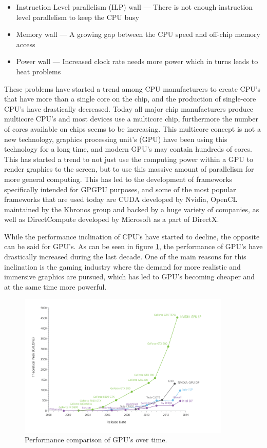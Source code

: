 \begin{itemize}
    \item Instruction Level parallelism (ILP) wall --- There is not enough instruction level parallelism to keep the CPU busy
    \item Memory wall --- A growing gap between the CPU speed and off-chip memory access
    \item Power wall --- Increased clock rate needs more power which in turns leads to heat problems
\end{itemize}

These problems have started a trend among CPU manufacturers to create CPU's that have more than a single core on the chip, and the production of single-core CPU's have drastically decreased. Today all major chip manufacturers produce multicore CPU's and most devices use a multicore chip, furthermore the number of cores available on chips seems to be increasing. This multicore concept is not a new technology, graphics processing unit's (GPU) have been using this technology for a long time, and modern GPU's may contain hundreds of cores. This has started a trend to not just use the computing power within a GPU to render graphics to the screen, but to use this massive amount of parallelism for more general computing. This has led to the development of frameworks specifically intended for GPGPU purposes, and some of the most popular frameworks that are used today are CUDA developed by Nvidia, OpenCL maintained by the Khronos group and backed by a huge variety of companies, as well as DirectCompute developed by Microsoft as a part of DirectX. 

While the performance inclination of CPU's have started to decline, the opposite can be said for GPU's. As can be seen in figure \ref{fig:GPUStats}, the performance of GPU's have drastically increased during the last decade. One of the main reasons for this inclination is the gaming industry where the demand for more realistic and immersive graphics are pursued, which has led to GPU's becoming cheaper and at the same time more powerful.

\begin{figure}[!htbp]
    \centering
    \includegraphics [width=0.9\textwidth]{Introduction/Figs/GPUstats.png}
    \caption{Performance comparison of GPU's over time. \cite{michaelGalloy}}
    \label{fig:GPUStats}
\end{figure}


